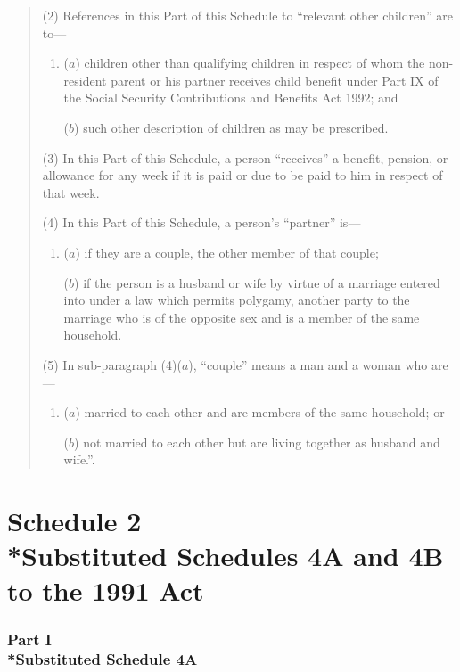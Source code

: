 \documentclass[12pt,a4paper]{article}
\begin{document}
\begin{quotation}
(2) References in this Part of this Schedule to “relevant other children” are to—
\begin{enumerate}\item[]
($a$) children other than qualifying children in respect of whom the non-resident parent or his partner receives child benefit under Part IX of the Social Security Contributions and Benefits Act 1992; and

($b$) such other description of children as may be prescribed.
\end{enumerate}

(3) In this Part of this Schedule, a person “receives” a benefit, pension, or allowance for any week if it is paid or due to be paid to him in respect of that week.

(4) In this Part of this Schedule, a person’s “partner” is—
\begin{enumerate}\item[]
($a$) if they are a couple, the other member of that couple;

($b$) if the person is a husband or wife by virtue of a marriage entered into under a law which permits polygamy, another party to the marriage who is of the opposite sex and is a member of the same household.
\end{enumerate}

(5) In sub-paragraph (4)($a$), “couple” means a man and a woman who are—
\begin{enumerate}\item[]
($a$) married to each other and are members of the same household; or

($b$) not married to each other but are living together as husband and wife.”.
\end{enumerate}
\end{quotation}

\part[Schedule 2 --- Substituted Schedules 4A and 4B to the 1991 Act]{Schedule 2\\*Substituted Schedules 4A and 4B to the 1991 Act}

\renewcommand\parthead{--- Schedule 2 Part I}


\section[Part I --- Substituted Schedule 4A]{Part I\\*Substituted Schedule 4A}
\end{document}
